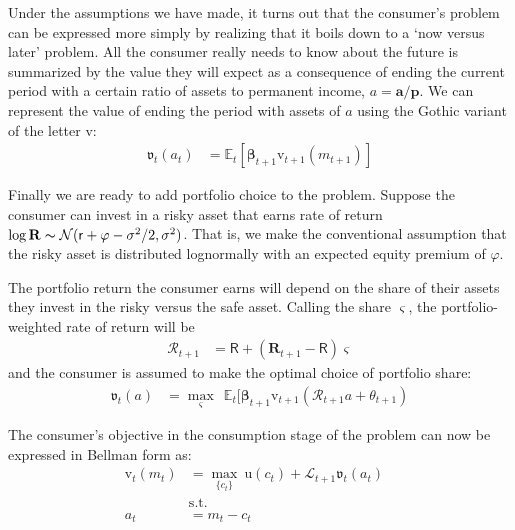 \documentclass{article}
\newcommand{\uFunc}{\mathrm{u}}
\newcommand{\pLvl}{\mathbf{p}}
\newcommand{\DiscFac}{\beta}
\newcommand{\vFunc}{\mathrm{v}}
\newcommand{\Alive}{\mathcal{L}}
\newcommand{\Ex}{\mathbb{E}}
\newcommand{\tranShkEmp}{\xi}
\newcommand{\cNrm}{c}
\newcommand{\Rfree}{\mathsf{R}}
\newcommand{\RNrm}{\mathcal{R}}
\newcommand{\aLvl}{\mathbf{a}}
\newcommand{\aNrm}{a}
\newcommand{\mNrm}{m}
\newcommand{\rfree}{\mathsf{r}}
\newcommand{\eprem}{\varphi}
\newcommand{\Risky}{\mathbf{R}}
\newcommand{\Rport}{\mathcal{R}}
\begin{document}

Under the assumptions we have made, it turns out that the consumer's problem can be expressed more simply by realizing that it boils down to a `now versus later' problem.  All the consumer really needs to know about the future is summarized by the value they will expect as a consequence of ending the current period with a certain ratio of assets to permanent income, $\aNrm = \aLvl/\pLvl$. We can represent the value of ending the period with assets of $\aNrm$ using the Gothic variant of the letter $\vFunc$:
\begin{align}
    \mathfrak{v}_{t}(\aNrm_{t}) & = \Ex_{t}[\pmb{\DiscFac}_{t+1}\vFunc_{t+1}(\mNrm_{t+1})]
\end{align}

Finally we are ready to add portfolio choice to the problem. Suppose the consumer can invest in a risky asset that earns rate of return $\log \Risky \thicksim \mathcal{N}(\rfree + \eprem - \sigma^{2}/2, \sigma^{2})$. That is, we make the conventional assumption that the risky asset is distributed lognormally with an expected equity premium of $\eprem$.

The portfolio return the consumer earns will depend on the share of their assets they invest in the risky versus the safe asset. Calling the share $\varsigma$, the portfolio-weighted rate of return will be
\begin{align}
    \Rport_{t+1} & = \Rfree + (\Risky_{t+1}-\Rfree)\varsigma
\end{align}
and the consumer is assumed to make the optimal choice of portfolio share:
\begin{align}
\mathfrak{v}_{t}(a) & = \max_{\varsigma}~~ \Ex_{t}[\pmb{\beta}_{t+1} \vFunc_{t+1}(\Rport_{t+1} a + \theta_{t+1})
\end{align}

The consumer's objective in the consumption stage of the problem can now be expressed in Bellman form as:
\begin{align}
    {\vFunc}_{t}({\mNrm}_{t}) & = \max_{\{\cNrm_{t}\}} ~ \uFunc(\cNrm_{t})+\Alive_{t+1} \mathfrak{v}_{t}(\aNrm_{t})
    \\ & \text{s.t.} &
    \\ \aNrm_{t} & = {\mNrm}_{t}-\cNrm_{t}
\end{align}
\end{document}
